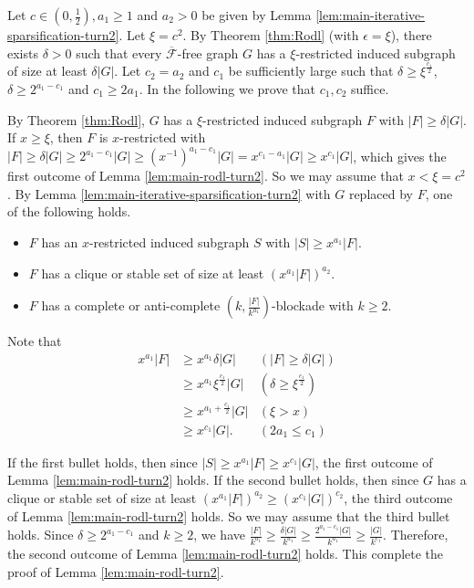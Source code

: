 \documentclass[a4paper,11pt]{article}
\let\oldendproof\endproof
\renewenvironment{proof}[1][\proofname]{%
	\oldproof[\normalfont\bfseries #1]%
}{\oldendproof}
\begin{document}
    \begin{proof}
        Let $c\in (0,\frac{1}{2}),a_1\geq1$ and $a_2>0$ be given by Lemma \ref{lem:main-iterative-sparsification-turn2}. 
        Let $\xi=c^2$. 
        By Theorem \ref{thm:Rodl} (with $\epsilon=\xi$), there exists $\delta>0$ such that every $\overline{\mathcal{F}}$-free graph $G$ has a $\xi$-restricted induced subgraph of size at least $\delta|G|$. 
        Let $c_2=a_2$ and $c_1$ be sufficiently large such that $\delta\geq \xi^{\frac{c_1}{2}}$, $\delta\geq 2^{a_1-c_1}$ and $c_1\geq 2a_1$. 
        In the following we prove that $c_1,c_2$ suffice. 
        
        By Theorem \ref{thm:Rodl}, $G$ has a $\xi$-restricted induced subgraph $F$ with $|F|\geq \delta|G|$. 
        If $x\geq \xi$, then $F$ is $x$-restricted with $|F|\geq \delta|G|\geq 2^{a_1-c_1}|G|\geq (x^{-1})^{a_1-c_1}|G|= x^{c_1-a_1}|G|\geq x^{c_1}|G|$, which gives the first outcome of Lemma \ref{lem:main-rodl-turn2}. 
        So we may assume that $x<\xi=c^2$. 
        By Lemma \ref{lem:main-iterative-sparsification-turn2} with $G$ replaced by $F$, one of the following holds. 
        \begin{itemize}
            \item $F$ has an $x$-restricted induced subgraph $S$ with $|S|\geq x^{a_1}|F|$. 
            
            \item $F$ has a clique or stable set of size at least $(x^{a_1}|F|)^{a_2}$.
            
            \item $F$ has a complete or anti-complete $(k,\frac{|F|}{k^{a_1}})$-blockade with $k\geq 2$. 
        \end{itemize}
        Note that 
        \begin{align*}
        x^{a_1}|F| & \geq x^{a_1}\delta|G| & (|F|\geq \delta|G|) \\
            & \geq x^{a_1}\xi^{\frac{c_1}{2}}|G| & (\delta\geq \xi^{\frac{c_1}{2}})\\
            & \geq x^{a_1+\frac{c_1}{2}}|G| & (\xi> x)\\
            & \geq x^{c_1}|G|. & (2a_1\leq c_1) 
        \end{align*}
        
        If the first bullet holds, then since $|S|\geq x^{a_1}|F|\geq x^{c_1}|G|$, the first outcome of Lemma \ref{lem:main-rodl-turn2} holds. 
        If the second bullet holds, then since $G$ has a clique or stable set of size at least $(x^{a_1}|F|)^{a_2}\geq (x^{c_1}|G|)^{c_2}$, the third outcome of Lemma \ref{lem:main-rodl-turn2} holds. 
        So we may assume that the third bullet holds.
        Since $\delta\geq 2^{a_1-c_1}$ and $k\geq 2$, we have $\frac{|F|}{k^{a_1}}\geq \frac{\delta|G|}{k^{a_1}}\geq \frac{2^{a_1-c_1}|G|}{k^{a_1}}\geq \frac{|G|}{k^{c_1}}$. 
        Therefore, the second outcome of Lemma \ref{lem:main-rodl-turn2} holds. 
        This complete the proof of Lemma \ref{lem:main-rodl-turn2}. 
    \end{proof}
    
\end{document}

